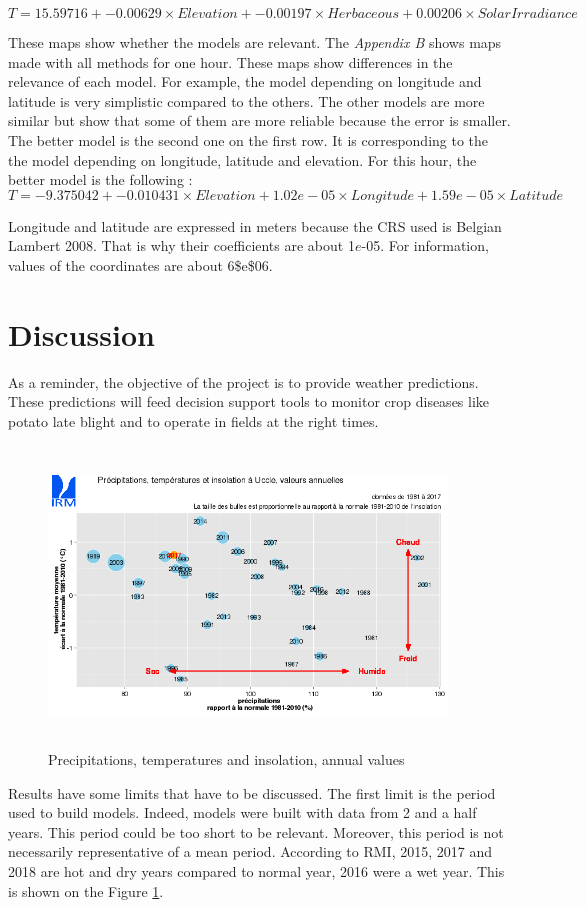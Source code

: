 \documentclass[12pt,twoside]{reedthesis}
\theoremstyle{definition}
\theoremstyle{definition}
\theoremstyle{definition}
\theoremstyle{remark}
\begin{document}
\[
T = 15.59716 + -0.00629 \times Elevation + -0.00197 \times Herbaceous + 0.00206 \times SolarIrradiance
\]

These maps show whether the models are relevant. The \emph{Appendix B}
shows maps made with all methods for one hour. These maps show
differences in the relevance of each model. For example, the model
depending on longitude and latitude is very simplistic compared to the
others. The other models are more similar but show that some of them are
more reliable because the error is smaller. The better model is the
second one on the first row. It is corresponding to the the model
depending on longitude, latitude and elevation. For this hour, the
better model is the following : \[
T = -9.375042 + -0.010431 \times Elevation + 1.02e-05 \times Longitude + 1.59e-05 \times Latitude
\]

Longitude and latitude are expressed in meters because the CRS used is
Belgian Lambert 2008. That is why their coefficients are about
1\(e\)-05. For information, values of the coordinates are about
6\$e\$06.

\section{Discussion}\label{discussion}

As a reminder, the objective of the project is to provide weather
predictions. These predictions will feed decision support tools to
monitor crop diseases like potato late blight and to operate in fields
at the right times.
\begin{figure}

{\centering \includegraphics[width=400px,height=300px]{figure/rmi_climate_data} 

}

\caption{Precipitations, temperatures and insolation, annual values}\label{fig:rmi}
\end{figure}
Results have some limits that have to be discussed. The first limit is
the period used to build models. Indeed, models were built with data
from 2 and a half years. This period could be too short to be relevant.
Moreover, this period is not necessarily representative of a mean
period. According to RMI, 2015, 2017 and 2018 are hot and dry years
compared to normal year, 2016 were a wet year. This is shown on the
Figure \ref{fig:rmi}.
\end{document}
